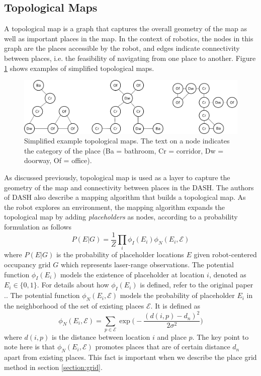 \documentclass[11pt, titlepage]{article}
\theoremstyle{definition}
\begin{document}
\subsection{Topological Maps}\label{section:topomap}

A topological map is a graph that captures the overall geometry of the map as well as important places in the map. In the context of robotics, the nodes in this graph are the places accessible by the robot, and edges indicate connectivity between places, i.e. the feasibility of navigating from one place to another. Figure \ref{fig:topomap} shows examples of simplified topological maps.
\begin{figure}[!htb]
    \centering
    \captionsetup{width=.8\linewidth}
    \includegraphics[scale=0.5]{images/example_place_maps.png}
    \caption{Simplified example topological maps. The text on a node indicates the category of the place (Ba = bathroom, Cr = corridor, Dw = doorway, Of = office).}
    \label{fig:topomap}
\end{figure}

As discussed previously, topological map is used as a layer to capture the geometry of the map and connectivity between places in the DASH. The authors of DASH \cite{pronobis2017deep} also describe a mapping algorithm that builds a topological map. As the robot explores an environment, the mapping algorithm expands the topological map by adding \textit{placeholders} \cite{pronobis2010representing} as nodes, according to a probability formulation as follows
\begin{equation}\label{eq:p_eg}
  P(E|G) = \frac{1}{Z}\prod_i\phi_I(E_i)\phi_N(E_i, \mathcal{E})
\end{equation}
where $P(E|G)$ is the probability of placeholder locations $E$ given robot-centered occupancy grid $G$ which represents laser-range observations. The potential function $\phi_I(E_i)$ models the existence of placeholder at location $i$, denoted as $E_i\in\{0,1\}$. For details about how $\phi_I(E_i)$ is defined, refer to the original paper \cite{pronobis2017deep}.. The potential function $\phi_N(E_i, \mathcal{E})$ models the probability of placeholder $E_i$ in the neighborhood of the set of existing places $\mathcal{E}$. It is defined as
\begin{equation}\label{eq:phi_n}
  \phi_N(E_i, \mathcal{E}) = \sum_{p\in\mathcal{E}}\exp\Big(-\frac{(d(i,p)-d_n)^2}{2\sigma^2}\Big)
\end{equation}
where $d(i,p)$ is the distance between location $i$ and place $p$. The key point to note here is that $\phi_N(E_i, \mathcal{E})$ promotes places that are of certain distance $d_n$ apart from existing places. This fact is important when we describe the place grid method in section \ref{section:grid}.
\end{document}
